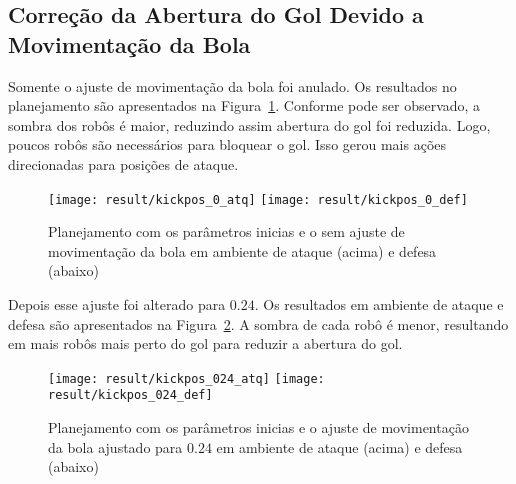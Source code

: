 \subsection{Correção da Abertura do Gol Devido a Movimentação da Bola}

Somente o ajuste de movimentação da bola foi anulado. Os resultados
no planejamento são apresentados na Figura~\ref{fig:kickpos_0}.
Conforme pode ser observado, a sombra dos robôs é maior, reduzindo
assim abertura do gol foi reduzida. Logo, poucos robôs são necessários
para bloquear o gol. Isso gerou mais ações direcionadas para posições
de ataque.

\begin{figure}[H]
  \centering
  \texttt{[image: result/kickpos\_0\_atq]}
  \texttt{[image: result/kickpos\_0\_def]}
  \caption{Planejamento com os parâmetros inicias e o sem ajuste
           de movimentação da bola em ambiente de
           ataque (acima) e defesa (abaixo)}\label{fig:kickpos_0}
\end{figure}

Depois esse ajuste foi alterado para $0.24$. Os resultados 
em ambiente de ataque e defesa são apresentados na
Figura~\ref{fig:kickpos_024}. A sombra de cada robô é
menor, resultando em mais robôs mais perto do gol para
reduzir a abertura do gol.

\begin{figure}[H]
  \centering
  \texttt{[image: result/kickpos\_024\_atq]}
  \texttt{[image: result/kickpos\_024\_def]}
  \caption{Planejamento com os parâmetros inicias e o ajuste de
           movimentação da bola ajustado para $0.24$ em ambiente de
           ataque (acima) e defesa (abaixo)}\label{fig:kickpos_024}
\end{figure}
